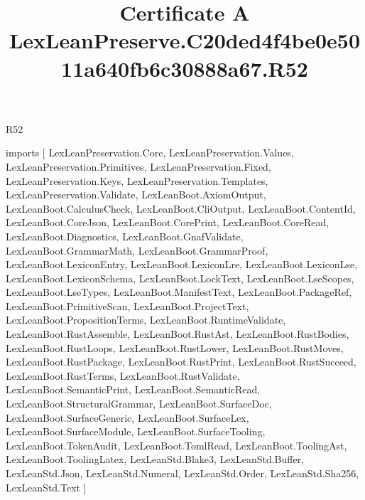 \begin{lexlean}{R52}
\title{Certificate A LexLeanPreserve.C20ded4f4be0e5011a640fb6c30888a67.R52}
\begin{coremodule}
imports [
  LexLeanPreservation.Core,
  LexLeanPreservation.Values,
  LexLeanPreservation.Primitives,
  LexLeanPreservation.Fixed,
  LexLeanPreservation.Keys,
  LexLeanPreservation.Templates,
  LexLeanPreservation.Validate,
  LexLeanBoot.AxiomOutput,
  LexLeanBoot.CalculusCheck,
  LexLeanBoot.CliOutput,
  LexLeanBoot.ContentId,
  LexLeanBoot.CoreJson,
  LexLeanBoot.CorePrint,
  LexLeanBoot.CoreRead,
  LexLeanBoot.Diagnostics,
  LexLeanBoot.GnafValidate,
  LexLeanBoot.GrammarMath,
  LexLeanBoot.GrammarProof,
  LexLeanBoot.LexiconEntry,
  LexLeanBoot.LexiconLre,
  LexLeanBoot.LexiconLse,
  LexLeanBoot.LexiconSchema,
  LexLeanBoot.LockText,
  LexLeanBoot.LseScopes,
  LexLeanBoot.LseTypes,
  LexLeanBoot.ManifestText,
  LexLeanBoot.PackageRef,
  LexLeanBoot.PrimitiveScan,
  LexLeanBoot.ProjectText,
  LexLeanBoot.PropositionTerms,
  LexLeanBoot.RuntimeValidate,
  LexLeanBoot.RustAssemble,
  LexLeanBoot.RustAst,
  LexLeanBoot.RustBodies,
  LexLeanBoot.RustLoops,
  LexLeanBoot.RustLower,
  LexLeanBoot.RustMoves,
  LexLeanBoot.RustPackage,
  LexLeanBoot.RustPrint,
  LexLeanBoot.RustSucceed,
  LexLeanBoot.RustTerms,
  LexLeanBoot.RustValidate,
  LexLeanBoot.SemanticPrint,
  LexLeanBoot.SemanticRead,
  LexLeanBoot.StructuralGrammar,
  LexLeanBoot.SurfaceDoc,
  LexLeanBoot.SurfaceGeneric,
  LexLeanBoot.SurfaceLex,
  LexLeanBoot.SurfaceModule,
  LexLeanBoot.SurfaceTooling,
  LexLeanBoot.TokenAudit,
  LexLeanBoot.TomlRead,
  LexLeanBoot.ToolingAst,
  LexLeanBoot.ToolingLatex,
  LexLeanStd.Blake3,
  LexLeanStd.Buffer,
  LexLeanStd.Json,
  LexLeanStd.Numeral,
  LexLeanStd.Order,
  LexLeanStd.Sha256,
  LexLeanStd.Text
]


\end{coremodule}
\end{lexlean}
